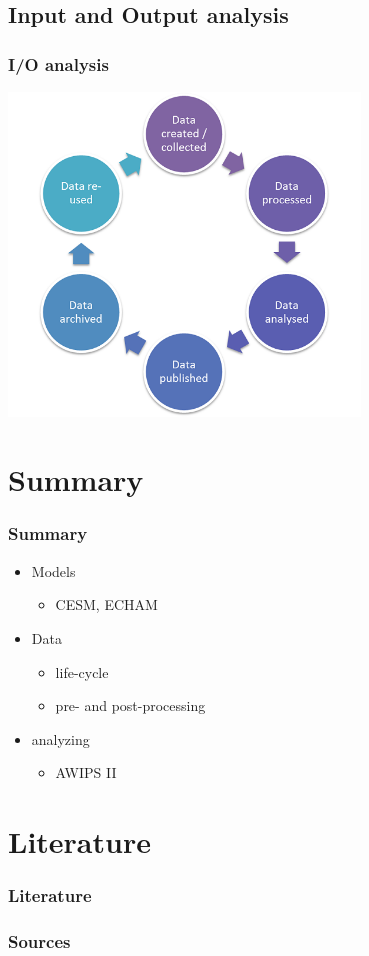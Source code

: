 \documentclass[compress]{beamer}
\begin{document}
\subsection{Input and Output analysis}
\begin{frame}[fragile]
	\frametitle{I/O analysis}
	\begin{center}
	\includegraphics[width=0.7\textwidth]{gfx/DataLifecycle.png}
	\end{center}

\end{frame}




\section{Summary}

\begin{frame}
	\frametitle{Summary}

	\begin{itemize}
		\item Models
		\begin{itemize}
			\item CESM, ECHAM
		\end{itemize}

		\item Data
		\begin{itemize}
			\item life-cycle
			\item pre- and post-processing
		\end{itemize}
		\item analyzing
		\begin{itemize}
		    \item AWIPS II
		\end{itemize}
	\end{itemize}
\end{frame}

\section*{Literature}

\begin{frame}[allowframebreaks]
	\frametitle{Literature}
    \frametitle{Sources}

	
	
\end{frame}
\end{document}
